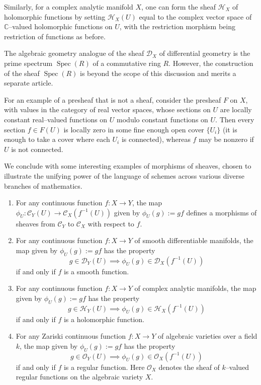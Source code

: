 \documentclass[12pt]{article}
\newcommand{\C}{\mathbb{C}}
\renewcommand{\H}{\mathcal{H}}
\renewcommand{\c}{\mathcal{C}}
\renewcommand{\O}{\mathcal{O}}
\newcommand{\D}{\mathcal{D}}
\begin{document}
\begin{example}
Similarly, for a complex analytic manifold $X$, one can form the sheaf
$\H_X$ of holomorphic functions by setting $\H_X(U)$ equal to the
complex vector space of $\C$--valued holomorphic functions on $U$,
with the restriction morphism being restriction of functions as
before.
\end{example}

\begin{example}
The algebraic geometry analogue of the sheaf $\D_X$ of differential
geometry is the prime spectrum $\operatorname{Spec}(R)$ of a
commutative ring $R$. However, the construction of the sheaf
$\operatorname{Spec}(R)$ is beyond the scope of this discussion and
merits a separate article.
\end{example}

\begin{example}
For an example of a presheaf that is not a sheaf, consider the
presheaf $F$ on $X$, with values in the category of real vector
spaces, whose sections on $U$ are locally constant real--valued
functions on $U$ modulo constant functions on $U$. Then every section
$f \in F(U)$ is locally zero in some fine enough open cover $\{U_i\}$
(it is enough to take a cover where each $U_i$ is connected), whereas
$f$ may be nonzero if $U$ is not connected.
\end{example}

We conclude with some interesting examples of morphisms of
sheaves, chosen to illustrate the unifying power of the language of
schemes across various diverse branches of mathematics.

\begin{enumerate}
\item For any continuous function $f\colon X \to Y$, the map $\phi_U\colon
\c_Y(U) \to \c_X(f^{-1}(U))$ given by $\phi_U(g) := gf$ defines a
morphisms of sheaves from $\c_Y$ to $\c_X$ with respect to $f$.
\item For any continuous function $f\colon X \to Y$ of smooth
differentiable manifolds, the map given by $\phi_U(g) := gf$ has the
property
$$
g \in \D_Y(U) \implies \phi_U(g) \in \D_X(f^{-1}(U))
$$
if and only if $f$ is a smooth function.
\item For any continuous function $f\colon X \to Y$ of complex analytic
manifolds, the map given by $\phi_U(g) := gf$ has the property
$$
g \in \H_Y(U) \implies \phi_U(g) \in \H_X(f^{-1}(U))
$$
if and only if $f$ is a holomorphic function.
\item For any Zariski continuous function $f\colon X \to Y$ of algebraic
varieties over a field $k$, the map given by $\phi_U(g) := gf$ has the
property
$$
g \in \O_Y(U) \implies \phi_U(g) \in \O_X(f^{-1}(U))
$$
if and only if $f$ is a regular function. Here $\O_X$ denotes the
sheaf of $k$--valued regular functions on the algebraic variety $X$.
\end{enumerate}
\end{document}
